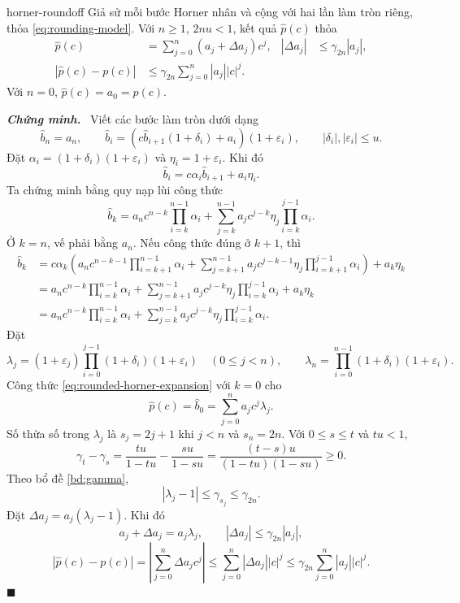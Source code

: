 \documentclass[12pt,a4paper,oneside]{book}
\numberwithin{algorithm}{chapter}
\theoremstyle{definition}
\newenvironment{chungminh}{\par\medskip\noindent\textbf{\textit{\color{mainblue}Chứng minh.}}\ }{\hfill$\blacksquare$\par\medskip}
\begin{document}
\begin{dinhly}{}{horner-roundoff}
Giả sử mỗi bước Horner nhân và cộng với hai lần làm tròn riêng, thỏa \eqref{eq:rounding-model}. Với $n\geq1$, $2nu<1$, kết quả $\widehat p(c)$ thỏa
\begin{align}
 \widehat p(c)&=\sum_{j=0}^{n}(a_j+\Delta a_j)c^j,
 &|\Delta a_j|&\leq\gamma_{2n}|a_j|,\label{eq:backward-horner}\\
 |\widehat p(c)-p(c)|&\leq\gamma_{2n}\sum_{j=0}^{n}|a_j||c|^j.
 \label{eq:forward-horner}
\end{align}
Với $n=0$, $\widehat p(c)=a_0=p(c)$.
\end{dinhly}
\begin{chungminh}
Viết các bước làm tròn dưới dạng
\[
 \widehat b_n=a_n,\qquad
 \widehat b_i=(c\widehat b_{i+1}(1+\delta_i)+a_i)(1+\varepsilon_i),
 \qquad |\delta_i|,|\varepsilon_i|\leq u.
\]
Đặt $\alpha_i=(1+\delta_i)(1+\varepsilon_i)$ và $\eta_i=1+\varepsilon_i$. Khi đó
\[
 \widehat b_i=c\alpha_i\widehat b_{i+1}+a_i\eta_i.
\]
Ta chứng minh bằng quy nạp lùi công thức
\begin{equation}\label{eq:rounded-horner-expansion}
 \widehat b_k=a_nc^{n-k}\prod_{i=k}^{n-1}\alpha_i
 +\sum_{j=k}^{n-1}a_jc^{j-k}\eta_j\prod_{i=k}^{j-1}\alpha_i.
\end{equation}
Ở $k=n$, vế phải bằng $a_n$. Nếu công thức đúng ở $k+1$, thì
\begin{align*}
 \widehat b_k
 &=c\alpha_k\left(a_nc^{n-k-1}\prod_{i=k+1}^{n-1}\alpha_i
   +\sum_{j=k+1}^{n-1}a_jc^{j-k-1}\eta_j
       \prod_{i=k+1}^{j-1}\alpha_i\right)+a_k\eta_k\\
 &=a_nc^{n-k}\prod_{i=k}^{n-1}\alpha_i
   +\sum_{j=k+1}^{n-1}a_jc^{j-k}\eta_j
       \prod_{i=k}^{j-1}\alpha_i+a_k\eta_k\\
 &=a_nc^{n-k}\prod_{i=k}^{n-1}\alpha_i
   +\sum_{j=k}^{n-1}a_jc^{j-k}\eta_j
       \prod_{i=k}^{j-1}\alpha_i.
\end{align*}
Đặt
\[
 \lambda_j=(1+\varepsilon_j)
   \prod_{i=0}^{j-1}(1+\delta_i)(1+\varepsilon_i)\quad(0\leq j<n),
 \qquad
 \lambda_n=\prod_{i=0}^{n-1}(1+\delta_i)(1+\varepsilon_i).
\]
Công thức \eqref{eq:rounded-horner-expansion} với $k=0$ cho
\[
 \widehat p(c)=\widehat b_0=\sum_{j=0}^{n}a_jc^j\lambda_j.
\]
Số thừa số trong $\lambda_j$ là $s_j=2j+1$ khi $j<n$ và $s_n=2n$. Với $0\leq s\leq t$ và $tu<1$,
\[
 \gamma_t-\gamma_s
 =\frac{tu}{1-tu}-\frac{su}{1-su}
 =\frac{(t-s)u}{(1-tu)(1-su)}\geq0.
\]
Theo bổ đề \ref{bd:gamma},
\[
 |\lambda_j-1|\leq\gamma_{s_j}\leq\gamma_{2n}.
\]
Đặt $\Delta a_j=a_j(\lambda_j-1)$. Khi đó
\[
 a_j+\Delta a_j=a_j\lambda_j,\qquad
 |\Delta a_j|\leq\gamma_{2n}|a_j|,
\]
\[
 |\widehat p(c)-p(c)|
 =\left|\sum_{j=0}^{n}\Delta a_jc^j\right|
 \leq\sum_{j=0}^{n}|\Delta a_j||c|^j
 \leq\gamma_{2n}\sum_{j=0}^{n}|a_j||c|^j.
\]
\end{chungminh}
\end{document}
